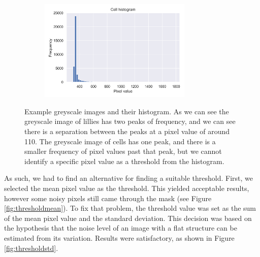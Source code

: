 \begin{figure}[h]
\begin{subfigure}{0.45\textwidth}
    \end{subfigure}
    \begin{subfigure}{0.45\textwidth}
        \centering
        \includegraphics[width=0.8\textwidth]{dissertation/figures/cell_histogram.png}
    \end{subfigure}
    \caption{Example greyscale images and their histogram. As we can see the greyscale image of lillies has two peaks of frequency, and we can see there is a separation between the peaks at a pixel value of around 110. The greyscale image of cells has one peak, and there is a smaller frequency of pixel values past that peak, but we cannot identify a specific pixel value as a threshold from the histogram.}
    \label{fig:thresholdhist}
\end{figure}

As such, we had to find an alternative for finding a suitable threshold. First, we selected the mean pixel value as the threshold. This yielded acceptable results, however some noisy pixels still came through the mask (see Figure \ref{fig:thresholdmean}). To fix that problem, the threshold value was set as the sum of the mean pixel value and the standard deviation. This decision was based on the hypothesis that the noise level of an image with a flat structure can be estimated from its variation. Results were satisfactory, as shown in Figure \ref{fig:thresholdstd}. 

